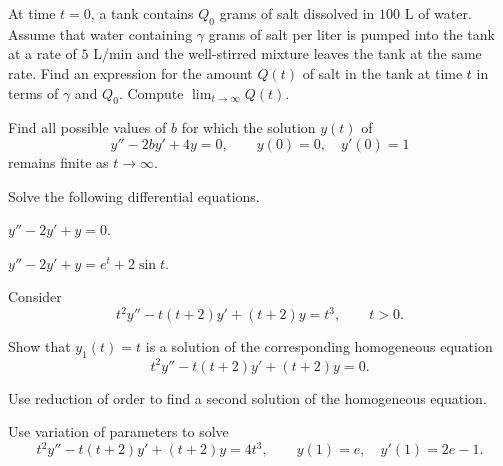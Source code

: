 \documentclass[11pt,oneside]{article}
\begin{document}
\begin{problem}
At time $t=0$, a tank contains $Q_0$ grams of salt dissolved in $100$ L of water. Assume that water containing $\gamma$ grams of salt per liter is pumped into the tank at a rate of $5$ L/min and the well-stirred mixture leaves the tank at the same rate. Find an expression for the amount $Q(t)$ of salt in the tank at time $t$ in terms of $\gamma$ and $Q_0$. Compute $\displaystyle\lim_{t\to\infty}Q(t)$.
\end{problem}

\begin{problem}
Find all possible values of $b$ for which the solution $y(t)$ of
\[
y''-2by'+4y=0,\qquad y(0)=0,\quad y'(0)=1
\]
remains finite as $t\to\infty$.
\end{problem}

\begin{problem}
Solve the following differential equations.
\begin{problemsubparts}
\item $y''-2y'+y=0$.
\item $y''-2y'+y=e^t+2\sin t$.
\end{problemsubparts}
\end{problem}

\begin{problem}
Consider
\[
t^2y''-t(t+2)y'+(t+2)y=t^3,\qquad t>0.
\]
\begin{problemsubparts}
\item Show that $y_1(t)=t$ is a solution of the corresponding homogeneous equation
\[
t^2y''-t(t+2)y'+(t+2)y=0.
\]
\item Use reduction of order to find a second solution of the homogeneous equation.
\item Use variation of parameters to solve
\[
t^2y''-t(t+2)y'+(t+2)y=4t^3,\qquad y(1)=e,\quad y'(1)=2e-1.
\]
\end{problemsubparts}
\end{problem}
\end{document}
